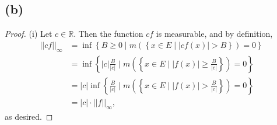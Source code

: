 \documentclass{article}
\newcommand{\R}{\mathbb{R}} %
\begin{document}
\subsection*{(b)}
\begin{proof}
	(i) Let $c \in \R$. Then the function $cf$ is measurable, and by definition,
	\begin{align}
		||cf||_{\infty} &= \inf \left\{B \geq 0 \;|\; m\left(\left\{x \in E \;|\; |cf(x)| > B\right\}\right) = 0\right\} \\
		&= \inf\left\{|c|\frac{B}{|c|} \;|\; m\left(\left\{x \in E \;|\; |f(x)| \geq \frac{B}{|c|}\right\}\right) = 0\right\} \\
		&= |c| \inf\left\{\frac{B}{|c|} \;|\; m\left(\left\{x \in E \;|\; |f(x)| > \frac{B}{|c|}\right\}\right) = 0\right\} \\
		&= |c| \cdot ||f||_{\infty}, 
	\end{align}
	as desired.
\end{proof}
 
\end{document}
